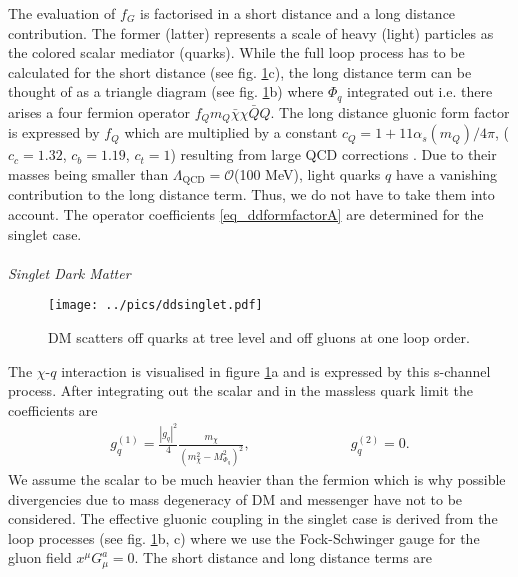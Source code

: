 \noindent The evaluation of $f_G$ is factorised in a short distance and a long distance 
contribution. The former (latter) represents a scale of heavy (light) particles as the colored scalar mediator (quarks). 
While the full loop process has to be calculated for the short distance (see fig. \ref{pic_ddsinglet}c), the long distance term can be thought of
as a triangle diagram (see fig. \ref{pic_ddsinglet}b) where $\Phi_q$ integrated 
out i.e. there arises a four fermion operator $f_Q m_Q \bar \chi \chi\bar Q Q$. The long distance gluonic form factor is expressed by $f_Q$ 
which are multiplied by a constant 
$c_Q = 1+11\alpha_s(m_Q)/4\pi$, ($c_c=1.32$, $c_b = 1.19$, $c_t = 1$)
resulting from large QCD corrections \cite{Djouadi}.
Due to their masses being smaller than $\Lambda_\text{QCD} = \mathcal{O}$(100 MeV), light quarks $q$ have a vanishing contribution to the long
distance term. Thus, we do not have to take them into account. The operator coefficients \eqref{eq_ddformfactorA} are determined for the 
singlet case.
\\ \\ \textit{Singlet Dark Matter}\\
\begin{figure}[t]
 \texttt{[image: ../pics/ddsinglet.pdf]}
 \caption{DM scatters off quarks at tree level and off gluons at one loop order.}
 \label{pic_ddsinglet}
\end{figure}
\noindent The $\chi$-$q$ interaction is visualised in figure \ref{pic_ddsinglet}a and is expressed by this s-channel process. After integrating out 
the scalar and in the massless quark limit the coefficients are
\begin{align}
 g_q^{(1)} = \frac{|g_q|^2 }{4} \frac{m_\chi}{\left(m_\chi^2 - M_{\Phi_q}^2\right)^2},\hspace{3cm} g_q^{(2)} = 0.
\end{align}
We assume the scalar to be much heavier than the fermion which is why possible divergencies due to mass degeneracy of DM and messenger have not
to be considered. 
The effective gluonic coupling in the 
singlet case is derived from the loop processes (see fig. \ref{pic_ddsinglet}b, c) 
where we use the Fock-Schwinger gauge for the gluon
field $x^\mu G^a_\mu = 0$. The short distance and long distance terms are
